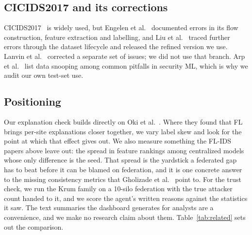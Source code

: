 \documentclass[conference]{IEEEtran}
\begin{document}
\subsection{CICIDS2017 and its corrections}
CICIDS2017~\cite{sharafaldin2018} is widely used, but Engelen et al.~\cite{engelen2021}
documented errors in its flow construction, feature extraction and labelling, and Liu et
al.~\cite{liu2022} traced further errors through the dataset lifecycle and released the
refined version we use. Lanvin et al.~\cite{lanvin2023} corrected a separate set of
issues; we did not use that branch. Arp et al.~\cite{arp2022} list data snooping among
common pitfalls in security ML, which is why we audit our own test-set use.

\subsection{Positioning}
Our explanation check builds directly on Oki et al.~\cite{oki2024}. Where they found that
FL brings per-site explanations closer together, we vary label skew and look for the
point at which that effect gives out. We also measure something the FL-IDS papers above
leave out: the spread in feature rankings among centralized models whose only difference
is the seed. That spread is the yardstick a federated gap has to beat before it can be
blamed on federation, and it is one concrete answer to the missing consistency metrics
that Gholizade et al.~\cite{gholizade2026} point to. For the trust check, we run the
Krum family on a 10-silo federation with the true attacker count handed to it, and we %
score the agent's written reasons against the statistics it saw. The text summaries the
dashboard generates for analysts are a convenience, and we make no research claim about
them. Table~\ref{tab:related} sets out the comparison.
\end{document}
